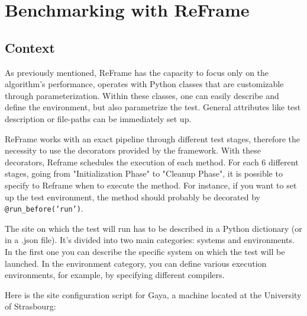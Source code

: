 \documentclass[12pt]{article}
\begin{document}
\vspace{1cm}

\section{Benchmarking with ReFrame}

\subsection{Context}
As previously mentioned, ReFrame has the capacity to focus only on the algorithm's performance, operates with Python classes that are customizable through parameterization.
Within these classes, one can easily describe and define the environment, but also parametrize the test.
General attributes like test description or file-paths can be immediately set up.

ReFrame works with an exact pipeline through different test stages, therefore the necessity to use the decorators provided by the framework.
With these decorators, Reframe schedules the execution of each method.
For each 6 different stages, going from "Initialization Phase" to "Cleanup Phase", it is possible to specify to Reframe when to execute the method.
For instance, if you want to set up the test environment, the method should probably be decorated by \texttt{@run\_before('run')}.

The site on which the test will run has to be described in a Python dictionary (or in a .json file).
It's divided into two main categories: systems and environments. \\
In the first one you can describe the specific system on which the test will be launched.
In the environment category, you can define various execution environments, for example, by specifying different compilers.

\newpage
Here is the site configuration script for Gaya, a machine located at the University of Strasbourg:
\vspace{10pt}
\end{document}

